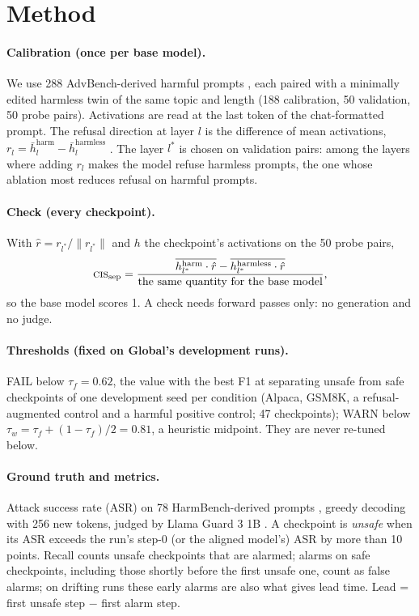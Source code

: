 \documentclass[11pt]{article}
\newcommand{\cissep}{\textsc{cis}$_{\text{sep}}$}
\begin{document}
\section{Method}
\label{sec:method}

\paragraph{Calibration (once per base model).} We use 288 AdvBench-derived harmful prompts \citep{zou2023advbench}, each
paired with a minimally edited harmless twin of the same topic and length (188 calibration, 50 validation, 50 probe
pairs). Activations are read at the last token of the chat-formatted prompt. The refusal direction at layer $l$ is the
difference of mean activations, $r_l=\bar h_l^{\text{harm}}-\bar h_l^{\text{harmless}}$ \citep{arditi2024refusal}. The
layer $l^*$ is chosen on validation pairs: among the layers where adding $r_l$ makes the model refuse harmless prompts,
the one whose ablation most reduces refusal on harmful prompts.

\paragraph{Check (every checkpoint).} With $\hat r=r_{l^*}/\lVert r_{l^*}\rVert$ and $h$ the checkpoint's activations on
the 50 probe pairs,
\begin{equation*}
\text{\cissep}=\frac{\overline{h_{l^*}^{\text{harm}}\cdot\hat r}-\overline{h_{l^*}^{\text{harmless}}\cdot\hat r}}
{\text{the same quantity for the base model}} ,
\end{equation*}
so the base model scores 1. A check needs forward passes only: no generation and no judge.

\paragraph{Thresholds (fixed on Global's development runs).} FAIL below $\tau_f=0.62$, the value with the best F1 at
separating unsafe from safe checkpoints of one development seed per condition (Alpaca, GSM8K, a refusal-augmented
control and a harmful positive control; 47 checkpoints); WARN below $\tau_w=\tau_f+(1-\tau_f)/2=0.81$, a heuristic
midpoint. They are never re-tuned below.

\paragraph{Ground truth and metrics.} Attack success rate (ASR) on 78 HarmBench-derived prompts
\citep{mazeika2024harmbench}, greedy decoding with 256 new tokens, judged by Llama Guard 3 1B
\citep{inan2023llamaguard}. A checkpoint is \emph{unsafe} when its ASR exceeds the run's step-0 (or the aligned model's)
ASR by more than 10 points. Recall counts unsafe checkpoints that are alarmed; alarms on safe checkpoints, including
those shortly before the first unsafe one, count as false alarms; on drifting runs these early alarms are also what
gives lead time. Lead = first unsafe step $-$ first alarm step.
\end{document}
